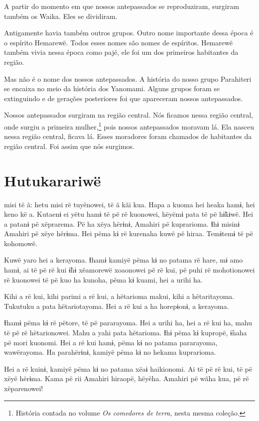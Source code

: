 A partir do momento em que nossos antepassados se reproduziram, surgiram
também os Waika. Eles se dividiram.

Antigamente havia também outros grupos. Outro nome importante dessa
época é o espírito Hemarewë. Todos esses nomes são nomes de espíritos.
Hemarewë também vivia nessa época como pajé, ele foi um dos primeiros
habitantes da região.

Mas não é o nome dos nossos antepassados. A história do nosso grupo
Parahiteri se encaixa no meio da história dos Yanomami. Alguns grupos
foram se extinguindo e de gerações posteriores foi que apareceram nossos
antepassados.

Nossos antepassados surgiram na região central. Nós ficamos nessa
região central, onde surgiu a primeira mulher,\footnote{História contada no volume \textit{Os comedores de terra}, nesta mesma coleção.} pois nossos antepassados
moravam lá. Ela nasceu nessa região central, ficava lá. Esses moradores
foram chamados de habitantes da região central. Foi assim que nós
surgimos.

\chapter{Hutukarariwë}
 
 misi të ã: hetu misi rë tuyënowei, të ã kãi kua. Hapa a kuoma hei
heaka hamɨ, hei keno kë a. Kutaenɨ ei yëtu hamɨ të pë rë kuonowei,
hëyëmɨ pata të pë hɨ̃kɨwë. Hei a patanɨ pë xëprarema. Pë ha xëya hërɨnɨ,
Amahiri pë kuprarioma. Ɨhɨ misinɨ Amahiri pë xëye hërɨma. Hei pëma kɨ rë
kurenaha kuwë pë hiraa. Temɨtemɨ të pë kohomowë.

Kuwë yaro hei a kerayoma. Ɨhamɨ kamiyë pëma kɨ no patama rë hare, mɨ amo
hamɨ, ai të pë rë kui ɨ̃hɨ xëamorewë xoaonowei pë rë kui, pë puhi rë
mohotionowei rë kuonowei të pë kuo ha kunoha, pëma kɨ kuami, hei a urihi
ha.

Kihi a rë kui, kihi parimi a rë kui, a hëtarioma makui, kihi a
hëtaritayoma. Tukutuku a pata hëtariotayoma. Hei a rë kui a ha
horepɨonɨ, a kerayoma.

Ɨhamɨ pëma kɨ rë pëtore, të pë pararayoma. Hei a urihi ha, hei a rë kui
ha, mahu të pë rë hëtarionowei. Mahu a yahi pata hëtarioma. Ɨhɨ pëma kɨ
kupropë, ɨ̃naha pë mori kuonomi. Hei a rë kui hamɨ, pëma kɨ no patama
pararayoma, wawërayoma. Ha parahërɨnɨ, kamiyë pëma kɨ no hekama
kuprarioma.

Hei a rë kuinɨ, kamiyë pëma kɨ no patama xëaɨ haikionomi. Ai të pë rë
kui, të pë xëyë hërɨma. Kama pë rii Amahiri hiraopë, hëyëha. Amahiri pë
wãha kua, pë rë xëparenowei!

